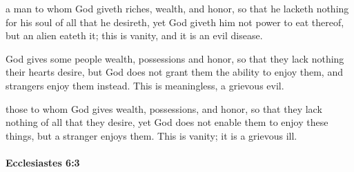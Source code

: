 			\begin{versebox}
					\item[BHS] 
					\item[LXX] 
					\item[ASV] a man to whom God giveth riches, wealth, and honor, so that he lacketh nothing for his soul of all that he desireth, yet God giveth him not power to eat thereof, but an alien eateth it; this is vanity, and it is an evil disease.
					\item[NIV] God gives some people wealth, possessions and honor, so that they lack nothing their hearts desire, but God does not grant them the ability to enjoy them, and strangers enjoy them instead. This is meaningless, a grievous evil.
					\item[NRSV] those to whom God gives wealth, possessions, and honor, so that they lack nothing of all that they desire, yet God does not enable them to enjoy these things, but a stranger enjoys them. This is vanity; it is a grievous ill.
			\end{versebox}

		\paragraph{Ecclesiastes 6:3} %
			\label{ECCLESIASTES-6-3}

